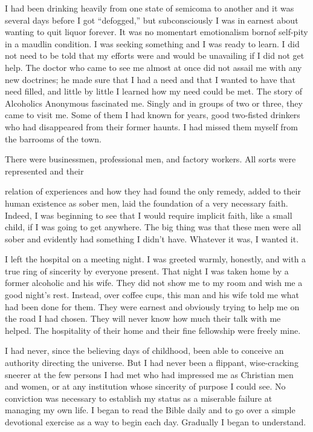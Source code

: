 \begin{biblechapter}
I had been drinking heavily from one state of semicoma to another and it was several days before I got “defogged,” but subconsciously I was in earnest about wanting to quit liquor forever. It was no momentart emotionalism bornof self-pity in a maudlin condition. I was seeking something and I was ready to learn. I did not need to be told that my efforts were and would be unavailing if I did not get help. The doctor who came to see me almost at once did not assail me with any new doctrines; he made sure that I had a need and that I wanted to have that need filled, and little by little I learned how my need could be met. The story of Alcoholics Anonymous fascinated me. Singly and in groups of two or three, they came to visit me. Some of them I had known for years, good two-fisted drinkers who had disappeared from their former haunts. I had missed them myself from the barrooms of the town.

There were businessmen, professional men, and factory workers. All sorts were represented and their

relation of experiences and how they had found the only remedy, added to their human existence as sober men, laid the foundation of a very necessary faith. Indeed, I was beginning to see that I would require implicit faith, like a small child, if I was going to get anywhere. The big thing was that these men were all sober and evidently had something I didn’t have. Whatever it was, I wanted it.

I left the hospital on a meeting night. I was greeted warmly, honestly, and with a true ring of sincerity by everyone present. That night I was taken home by a former alcoholic and his wife. They did not show me to my room and wish me a good night’s rest. Instead, over coffee cups, this man and his wife told me what had been done for them. They were earnest and obviously trying to help me on the road I had chosen. They will never know how much their talk with me helped. The hospitality of their home and their fine fellowship were freely mine.

I had never, since the believing days of childhood, been able to conceive an authority directing the universe. But I had never been a flippant, wise-cracking sneerer at the few persons I had met who had impressed me as Christian men and women, or at any institution whose sincerity of purpose I could see. No conviction was necessary to establish my status as a miserable failure at managing my own life. I began to read the Bible daily and to go over a simple devotional exercise as a way to begin each day. Gradually I began to understand.


\end{biblechapter}
